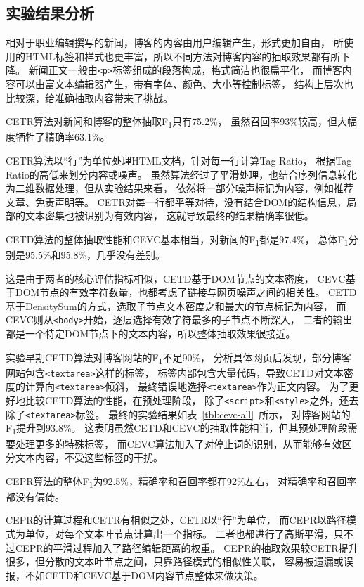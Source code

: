 \subsection{实验结果分析}

相对于职业编辑撰写的新闻，博客的内容由用户编辑产生，形式更加自由，
所使用的HTML标签和样式也更丰富，所以不同方法对博客内容的抽取效果都有所下降。
新闻正文一般由\texttt{<p>}标签组成的段落构成，格式简洁也很扁平化，
而博客内容可以由富文本编辑器产生，带有字体、颜色、大小等控制标签，
结构上层次也比较深，给准确抽取内容带来了挑战。

CETR算法对新闻和博客的整体抽取F\textsubscript{1}只有75.2\%，
虽然召回率93\%较高，但大幅度牺牲了精确率63.1\%。

CETR算法以“行”为单位处理HTML文档，针对每一行计算Tag Ratio，
根据Tag Ratio的高低来划分内容或噪声。
虽然算法经过了平滑处理，也结合序列信息转化为二维数据处理，但从实验结果来看，
依然将一部分噪声标记为内容，例如推荐文章、免责声明等。
CETR对每一行都平等对待，没有结合DOM的结构信息，局部的文本密集也被识别为有效内容，
这就导致最终的结果精确率很低。

CETD算法的整体抽取性能和CEVC基本相当，对新闻的F\textsubscript{1}都是97.4\%，
总体F\textsubscript{1}分别是95.5\%和95.8\%，几乎没有差别。

这是由于两者的核心评估指标相似，CETD基于DOM节点的文本密度，
CEVC基于DOM节点的有效字符数量，也都考虑了链接与网页噪声之间的相关性。
CETD基于DensitySum的方式，选取子节点文本密度之和最大的节点标记为内容，
而CEVC则从\texttt{<body>}开始，逐层选择有效字符最多的子节点不断深入，
二者的输出都是一个特定DOM节点下的文本内容，所以整体抽取效果很接近。

实验早期CETD算法对博客网站的F\textsubscript{1}不足90\%，
分析具体网页后发现，部分博客网站包含\texttt{<textarea>}这样的标签，
标签内部包含大量代码，导致CETD对文本密度的计算向\texttt{<textarea>}倾斜，
最终错误地选择\texttt{<textarea>}作为正文内容。
为了更好地比较CETD算法的性能，在预处理阶段，
除了\texttt{<script>}和\texttt{<style>}之外，还去除了\texttt{<textarea>}标签。
最终的实验结果如表~\ref{tbl:cevc-all}~所示，
对博客网站的F\textsubscript{1}提升到93.8\%。
这表明虽然CETD和CEVC的抽取性能相当，但其预处理阶段需要处理更多的特殊标签，
而CEVC算法加入了对停止词的识别，从而能够有效区分文本内容，不受这些标签的干扰。

CEPR算法的整体F\textsubscript{1}为92.5\%，精确率和召回率都在92\%左右，
对精确率和召回率都没有偏倚。

CEPR的计算过程和CETR有相似之处，CETR以“行”为单位，
而CEPR以路径模式为单位，对每个文本叶节点计算出一个指标。
二者也都进行了高斯平滑，只不过CEPR的平滑过程加入了路径编辑距离的权重。
CEPR的抽取效果较CETR提升很多，但分散的文本叶节点之间，只靠路径模式的相似性关联，
容易被遗漏或误报，不如CETD和CEVC基于DOM内容节点整体来做决策。

